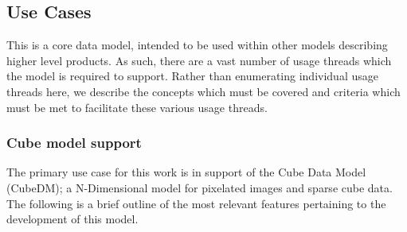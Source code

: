 \documentclass[11pt,a4paper]{ivoa}
\begin{document}
\subsection{Use Cases}
\label{sect:usecases}

This is a core data model, intended to be used within other models describing higher level products.
As such, there are a vast number of usage threads which the model is required to support.  Rather than
enumerating individual usage threads here, we describe the concepts which must be covered and criteria
which must be met to facilitate these various usage threads.


\subsubsection{Cube model support}
\label{uc:Cube-model-support}
  The primary use case for this work is in support of the Cube Data Model (CubeDM); 
  a N-Dimensional model for pixelated images and sparse cube data.  
  The following is a brief outline of the most relevant features pertaining to the
  development of this model.
\end{document}
